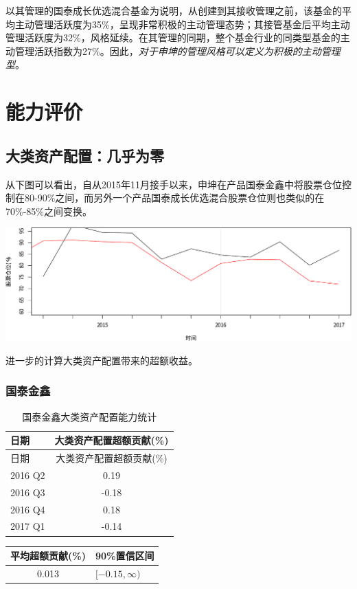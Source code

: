 \documentclass[hyperref,]{ctexart}
\begin{document}
以其管理的国泰成长优选混合基金为说明，从创建到其接收管理之前，该基金的平均主动管理活跃度为35\%，呈现非常积极的主动管理态势；其接管基金后平均主动管理活跃度为32\%，风格延续。在其管理的同期，整个基金行业的同类型基金的主动管理活跃指数为27\%。因此，\emph{对于申坤的管理风格可以定义为积极的主动管理型}。

\section{能力评价}

\subsection{大类资产配置：几乎为零}

从下图可以看出，自从2015年11月接手以来，申坤在产品国泰金鑫中将股票仓位控制在80-90\%之间，而另外一个产品国泰成长优选混合股票仓位则也类似的在70\%-85\%之间变换。

\includegraphics{shenkun-details_files/figure-latex/unnamed-chunk-11-1.pdf}

进一步的计算大类资产配置带来的超额收益。

\subsubsection{国泰金鑫}\label{-2}

\begin{longtable}[]{@{}lc@{}}
\caption{国泰金鑫大类资产配置能力统计}\tabularnewline
\toprule
日期 & 大类资产配置超额贡献(\%)\tabularnewline
\midrule
\endfirsthead
\toprule
日期 & 大类资产配置超额贡献(\%)\tabularnewline
\midrule
\endhead
2016 Q2 & 0.19\tabularnewline
2016 Q3 & -0.18\tabularnewline
2016 Q4 & 0.18\tabularnewline
2017 Q1 & -0.14\tabularnewline
\bottomrule
\end{longtable}

\begin{longtable}[]{@{}cl@{}}
\toprule
平均超额贡献(\%) & 90\%置信区间\tabularnewline
\midrule
\endhead
0.013 & \([-0.15,\infty)\)\tabularnewline
\bottomrule
\end{longtable}
\end{document}
